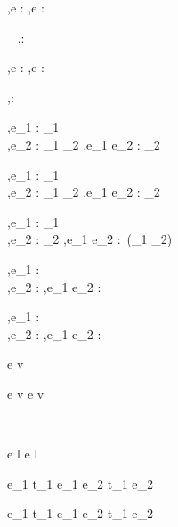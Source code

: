   {\Gamma,\Sigma \infers e : \beta}
  {\Gamma,\Sigma \infers \Edit e : \Task \beta}

  {\ }
  {\Gamma,\Sigma \infers \Enter \beta : \Task \beta}

  {\Gamma,\Sigma \infers e : \Reference \beta}
  {\Gamma,\Sigma \infers \Update e : \Task \beta}


  { }
  {\Gamma,\Sigma \infers \Fail : \Task \alpha}


  {\Gamma,\Sigma \infers e_1 : \Task \tau_1 \\
   \Gamma,\Sigma \infers e_2 : \tau_1 \to \Task \tau_2}
  {\Gamma,\Sigma \infers e_1 \Then e_2 : \Task \tau_2}


  {\Gamma,\Sigma \infers e_1 : \Task \tau_1 \\
   \Gamma,\Sigma \infers e_2 : \tau_1 \to \Task \tau_2}
  {\Gamma,\Sigma \infers e_1 \Next e_2 : \Task \tau_2}


  {\Gamma,\Sigma \infers e_1 : \Task \tau_1 \\
   \Gamma,\Sigma \infers e_2 : \Task \tau_2}
  {\Gamma,\Sigma \infers e_1 \And e_2 : \Task\,(\tau_1 \times \tau_2)}


  {\Gamma,\Sigma \infers e_1 : \Task \tau \\
   \Gamma,\Sigma \infers e_2 : \Task \tau }
  {\Gamma,\Sigma \infers e_1 \Or e_2 : \Task \tau}


  {\Gamma,\Sigma \infers e_1 : \Task \tau \\
   \Gamma,\Sigma \infers e_2 : \Task \tau }
  {\Gamma,\Sigma \infers e_1 \Xor e_2 : \Task \tau}





  {e \evaluate v}


  {e \evaluate v}
  {\Edit e \evaluate \Edit v}

  {\ }
  {\Enter \beta \evaluate \Enter \beta}

  {e \evaluate l}
  {\Update e \evaluate \Update l}


  { }
  {\Fail \evaluate \Fail}


  {e_1 \evaluate t_1}
  {e_1 \Then e_2 \evaluate t_1 \Then e_2}

  {e_1 \evaluate t_1}
  {e_1 \Next e_2 \evaluate t_1 \Next e_2}


